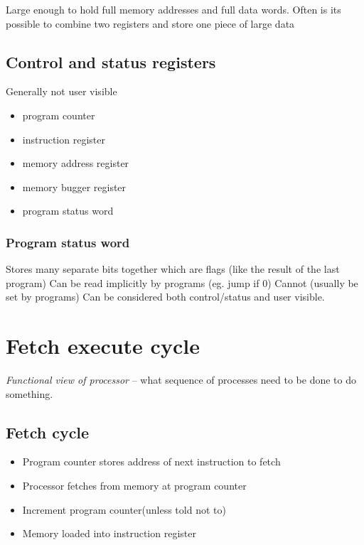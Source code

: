 Large enough to hold full memory addresses and full data words.
Often is its possible to combine two registers and store one piece of large data

\subsection{Control and status registers}\label{sub:control_and_status_registers}

Generally not user visible
\begin{itemize}
    \item program counter
    \item instruction register
    \item  memory address register
    \item memory bugger register
    \item program status word
\end{itemize}

\subsubsection{Program status word}\label{ssub:program_status_word}

Stores many separate bits together which are flags (like the result of the last program)
Can be read implicitly by programs (eg. jump if \(0\))
Cannot (usually be set by programs)
Can be considered both control/status and user visible.

\section{Fetch execute cycle}\label{sec:fetch_execute_cycle}

\emph{Functional view of processor} -- what sequence of processes need to be done to do something.

\subsection{Fetch cycle}\label{sub:fetch_cycle}

\begin{itemize}
    \item Program counter stores address of next instruction to fetch
    \item Processor fetches from memory at program counter
    \item Increment program counter(unless told not to)
    \item Memory loaded into instruction register
\end{itemize}
